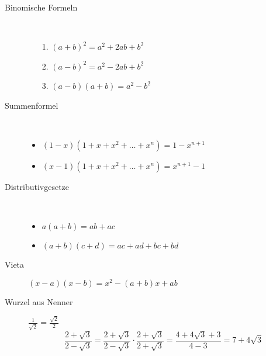 \begin{description}
    \item[Binomische Formeln] \
    \begin{itemize}
        \item[1.] $(a+b)^2=a^2+2ab+b^2$
        \item[2.] $(a-b)^2=a^2-2ab+b^2$
        \item[3.] $(a-b)(a+b)=a^2-b^2$
    \end{itemize}
    \item[Summenformel] \
    \begin{itemize}
        \item $(1-x)(1+x+x^2+\dots +x^n)=1-x^{n+1}$
        \item $(x-1)(1+x+x^2+\dots +x^n)=x^{n+1}-1$
    \end{itemize}
    \item[Distributivgesetze] \
    \begin{itemize}
        \item $a(a+b)=ab+ac$
        \item $(a+b)(c+d) = ac +ad + bc +bd$
    \end{itemize}
    \item[Vieta] $(x-a)(x-b) = x^2 - (a+b)x+ab$
    \item[Wurzel aus Nenner] $\frac{1}{\sqrt{2}}=\frac{\sqrt{2}}{2}$
    $$\frac{2+\sqrt{3}}{2-\sqrt{3}}=\frac{2+\sqrt{3}}{2-\sqrt{3}} \cdot \frac{2+\sqrt{3}}{2+\sqrt{3}}=\frac{4+4\sqrt{3}+3}{4-3}=7+4\sqrt{3}$$
\end{description}